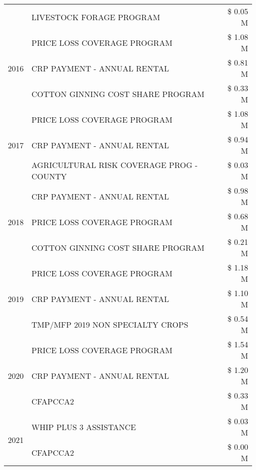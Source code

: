 \begin{tabular}{llr}
 & LIVESTOCK FORAGE PROGRAM & \$ 0.05 M \\
\cline{1-3}
\multirow[t]{3}{*}{2016} & PRICE LOSS COVERAGE PROGRAM & \$ 1.08 M \\
 & CRP PAYMENT - ANNUAL RENTAL & \$ 0.81 M \\
 & COTTON GINNING COST SHARE PROGRAM & \$ 0.33 M \\
\cline{1-3}
\multirow[t]{3}{*}{2017} & PRICE LOSS COVERAGE PROGRAM & \$ 1.08 M \\
 & CRP PAYMENT - ANNUAL RENTAL & \$ 0.94 M \\
 & AGRICULTURAL RISK COVERAGE PROG - COUNTY & \$ 0.03 M \\
\cline{1-3}
\multirow[t]{3}{*}{2018} & CRP PAYMENT - ANNUAL RENTAL & \$ 0.98 M \\
 & PRICE LOSS COVERAGE PROGRAM & \$ 0.68 M \\
 & COTTON GINNING COST SHARE PROGRAM & \$ 0.21 M \\
\cline{1-3}
\multirow[t]{3}{*}{2019} & PRICE LOSS COVERAGE PROGRAM & \$ 1.18 M \\
 & CRP PAYMENT - ANNUAL RENTAL & \$ 1.10 M \\
 & TMP/MFP 2019 NON SPECIALTY CROPS & \$ 0.54 M \\
\cline{1-3}
\multirow[t]{3}{*}{2020} & PRICE LOSS COVERAGE PROGRAM & \$ 1.54 M \\
 & CRP PAYMENT - ANNUAL RENTAL & \$ 1.20 M \\
 & CFAPCCA2 & \$ 0.33 M \\
\cline{1-3}
\multirow[t]{2}{*}{2021} & WHIP PLUS 3 ASSISTANCE & \$ 0.03 M \\
 & CFAPCCA2 & \$ 0.00 M \\
\cline{1-3}
\bottomrule
\end{tabular}
